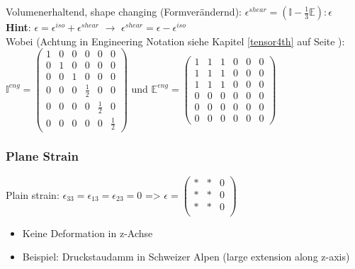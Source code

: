 \documentclass[a4paper, 10pt]{scrartcl}
\begin{document}
Volumenerhaltend, shape changing (Formverändernd): $\epsilon^{shear} =
(\mathbb{I} - \frac{1}{3} \mathbb{E} ) : \epsilon $\\
\textbf{Hint}: $\epsilon = \epsilon^{iso} + \epsilon^{shear}$ $\rightarrow$
$\epsilon^{shear} = \epsilon -\epsilon^{iso}$\\
Wobei (Achtung in Engineering
Notation siehe Kapitel \ref{tensor4th} auf Seite \pageref{tensor4th}):\\ $ \mathbb{I}^{eng}=
\begin{pmatrix}
1 & 0 & 0 & 0 & 0 & 0 \\ 
0 & 1 & 0 & 0 & 0 & 0 \\ 
0 & 0 & 1 & 0 & 0 & 0 \\ 
0 & 0 & 0 & \frac{1}{2} & 0 & 0 \\ 
0 & 0 & 0 & 0 & \frac{1}{2} & 0 \\ 
0 & 0 & 0 & 0 & 0 & \frac{1}{2}
\end{pmatrix} 
$ und 
$ \mathbb{E}^{eng}=
\begin{pmatrix}
1 & 1 & 1 & 0 & 0 & 0 \\ 
1 & 1 & 1 & 0 & 0 & 0 \\ 
1 & 1 & 1 & 0 & 0 & 0 \\ 
0 & 0 & 0 & 0 & 0 & 0 \\ 
0 & 0 & 0 & 0 & 0 & 0 \\ 
0 & 0 & 0 & 0 & 0 & 0
\end{pmatrix} 
$

\subsubsection{Plane Strain}
Plain strain: $\epsilon_{33} = \epsilon_{13} = \epsilon_{23}= 0$ => $\epsilon =
\begin{pmatrix}
* & * & 0\\
* & * & 0\\
* & * & 0\\
\end{pmatrix} $\\
\begin{itemize}
	\item Keine Deformation in z-Achse
	\item Beispiel: Druckstaudamm in Schweizer Alpen (large extension along
	z-axis)
\end{itemize}
\end{document}
